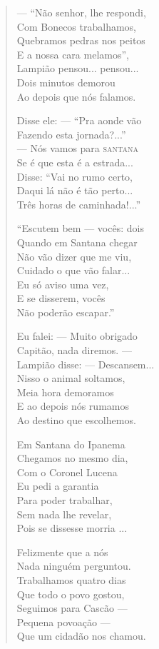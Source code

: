 \begin{verse}
---  ``Não senhor, lhe respondi, \\
Com Bonecos trabalhamos, \\
Quebramos pedras nos peitos \\
E a nossa cara melamos'', \\
Lampião pensou... pensou... \\
Dois minutos demorou \\
Ao depois que nós falamos. 

Disse ele: ---  ``Pra aonde vão \\
Fazendo esta jornada?...'' \\
---  Nós vamos para \textsc{santana} \\
Se é que esta é a estrada... \\
Disse: ``Vai no rumo certo, \\
Daqui lá não é tão perto... \\
Três horas de caminhada!...'' 

``Escutem bem ---  vocês: dois \\
Quando em Santana chegar \\
Não vão dizer que me viu, \\
Cuidado o que vão falar... \\
Eu só aviso uma vez, \\
E se disserem, vocês \\
Não poderão escapar.'' 
\pagebreak

Eu falei: ---  Muito obrigado \\
Capitão, nada diremos. --- \\
Lampião disse: ---  Descansem... \\
Nisso o animal soltamos, \\
Meia hora demoramos \\
E ao depois nós rumamos \\
Ao destino que escolhemos. 

Em Santana do Ipanema \\
Chegamos no mesmo dia, \\
Com o Coronel Lucena \\
Eu pedi a garantia \\
Para poder trabalhar, \\
Sem nada lhe revelar, \\
Pois se dissesse morria ... 

Felizmente que a nós \\
Nada ninguém perguntou. \\
Trabalhamos quatro dias \\
Que todo o povo gostou, \\
Seguimos para Cascão --- \\
Pequena povoação ---\\
Que um cidadão nos chamou. 


\end{verse}
